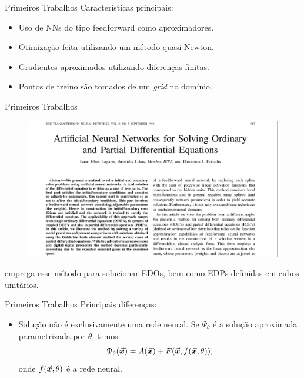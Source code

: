 \documentclass[13pt]{beamer}
\begin{document}
\begin{frame}{Primeiros Trabalhos}
    Características principais:
    \begin{itemize}
        \item<1-> Uso de NNs do tipo feedforward como aproximadores.
        \item<2-> Otimização feita utilizando um método quasi-Newton.
        \item<3-> Gradientes aproximados utilizando diferenças finitas.
        \item<4-> Pontos de treino são tomados de um \emph{grid} no domínio.
    \end{itemize}
\end{frame}

\begin{frame}{Primeiros Trabalhos}
    \begin{figure}[htb]
        \includegraphics[width=.8\textwidth]{../figuras/seminal-1998.png}
    \end{figure}
    \cite{lagaris98} emprega esse método para solucionar EDOs, bem como EDPs definidas em cubos unitários.
\end{frame}

\begin{frame}{Primeiros Trabalhos}
    Principais diferenças:
    \begin{itemize}
        \item<1-> Solução não é exclusivamente uma rede neural.
            Se \( \Psi_{ \theta } \) é a solução aproximada parametrizada por \( \theta \), temos
            \begin{equation*}
                \Psi_{ \theta } ( \vec{\bm{x}} ) = A ( \vec{\bm{x}} ) + F ( \vec{\bm{x}}, f ( \vec{\bm{x}}, \theta ) )
            ,\end{equation*}
            onde \( f ( \vec{\bm{x}}, \theta ) \) é a rede neural.

    \end{itemize}
\end{frame}
\end{document}
